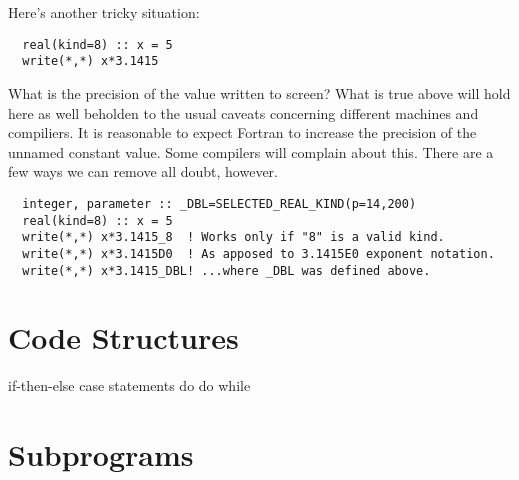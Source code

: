\documentclass[11pt, letterpaper]{article}
\begin{document}
Here's another tricky situation:
\begin{verbatim}
  real(kind=8) :: x = 5
  write(*,*) x*3.1415
\end{verbatim}
What is the precision of the value written to screen?  What is true above
will hold here as well beholden to the usual caveats concerning different
machines and compiliers.  It is reasonable to expect Fortran to increase the
precision of the unnamed constant value.  Some compilers will complain about
this.  There are a few ways we can remove all doubt, however.
\begin{verbatim}
  integer, parameter :: _DBL=SELECTED_REAL_KIND(p=14,200)
  real(kind=8) :: x = 5
  write(*,*) x*3.1415_8  ! Works only if "8" is a valid kind.
  write(*,*) x*3.1415D0  ! As apposed to 3.1415E0 exponent notation.
  write(*,*) x*3.1415_DBL! ...where _DBL was defined above.
\end{verbatim}

\section{Code Structures}

if-then-else
case statements
do
do while


\section{Subprograms}
\end{document}

